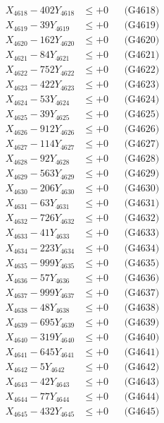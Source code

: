 \documentclass[a4paper,10pt]{article}
\begin{document}
{\begin{align}
X_{4618} - 402Y_{4618} &\leq +0 && \text{(G4618)} \\
X_{4619} - 39Y_{4619} &\leq +0 && \text{(G4619)} \\
X_{4620} - 162Y_{4620} &\leq +0 && \text{(G4620)} \\
\allowbreak
X_{4621} - 84Y_{4621} &\leq +0 && \text{(G4621)} \\
X_{4622} - 752Y_{4622} &\leq +0 && \text{(G4622)} \\
X_{4623} - 422Y_{4623} &\leq +0 && \text{(G4623)} \\
X_{4624} - 53Y_{4624} &\leq +0 && \text{(G4624)} \\
X_{4625} - 39Y_{4625} &\leq +0 && \text{(G4625)} \\
X_{4626} - 912Y_{4626} &\leq +0 && \text{(G4626)} \\
X_{4627} - 114Y_{4627} &\leq +0 && \text{(G4627)} \\
X_{4628} - 92Y_{4628} &\leq +0 && \text{(G4628)} \\
X_{4629} - 563Y_{4629} &\leq +0 && \text{(G4629)} \\
X_{4630} - 206Y_{4630} &\leq +0 && \text{(G4630)} \\
\allowbreak
X_{4631} - 63Y_{4631} &\leq +0 && \text{(G4631)} \\
X_{4632} - 726Y_{4632} &\leq +0 && \text{(G4632)} \\
X_{4633} - 41Y_{4633} &\leq +0 && \text{(G4633)} \\
X_{4634} - 223Y_{4634} &\leq +0 && \text{(G4634)} \\
X_{4635} - 999Y_{4635} &\leq +0 && \text{(G4635)} \\
X_{4636} - 57Y_{4636} &\leq +0 && \text{(G4636)} \\
X_{4637} - 999Y_{4637} &\leq +0 && \text{(G4637)} \\
X_{4638} - 48Y_{4638} &\leq +0 && \text{(G4638)} \\
X_{4639} - 695Y_{4639} &\leq +0 && \text{(G4639)} \\
X_{4640} - 319Y_{4640} &\leq +0 && \text{(G4640)} \\
\allowbreak
X_{4641} - 645Y_{4641} &\leq +0 && \text{(G4641)} \\
X_{4642} - 5Y_{4642} &\leq +0 && \text{(G4642)} \\
X_{4643} - 42Y_{4643} &\leq +0 && \text{(G4643)} \\
X_{4644} - 77Y_{4644} &\leq +0 && \text{(G4644)} \\
X_{4645} - 432Y_{4645} &\leq +0 && \text{(G4645)} \\

\end{align}}
\end{document}
